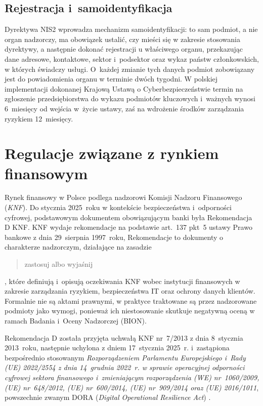 \subsection{Rejestracja i~samoidentyfikacja}

Dyrektywa NIS2 wprowadza mechanizm {samoidentyfikacji}: to sam podmiot, a nie organ nadzorczy, ma obowiązek ustalić, czy mieści się w zakresie
stosowania dyrektywy, a następnie dokonać rejestracji u właściwego organu, przekazując dane adresowe, kontaktowe, sektor i~podsektor oraz wykaz państw
członkowskich, w których świadczy usługi. O~każdej zmianie tych danych podmiot zobowiązany jest do powiadomienia organu w terminie dwóch tygodni.
W polskiej implementacji dokonanej Krajową Ustawą o Cyberbezpieczeństwie\autocite{uksc2026} termin na zgłoszenie przedsiębiorstwa do wykazu
podmiotów kluczowych i~ważnych wynosi 6~miesięcy od wejścia w~życie ustawy, zaś na wdrożenie środków zarządzania ryzykiem 12~miesięcy.

\section{Regulacje związane z rynkiem finansowym}

Rynek finansowy w Polsce podlega nadzorowi Komisji Nadzoru Finansowego (\textit{KNF}). Do stycznia 2025~roku w kontekście bezpieczeństwa i~odporności cyfrowej,
podstawowym dokumentem obowiązującym banki była {Rekomendacja D KNF}\autocite{knf_rekomendacja_d_2013}.
KNF wydaje rekomendacje na podstawie art.~137 pkt~5 ustawy Prawo bankowe z dnia 29~sierpnia 1997~roku, Rekomendacje to dokumenty o charakterze nadzorczym,
działające na zasadzie \blockquote{zastosuj albo wyjaśnij}, które definiują i~opisują oczekiwania KNF wobec instytucji finansowych w zakresie
zarządzania ryzykiem, bezpieczeństwa IT oraz ochrony danych klientów. Formalnie nie są aktami prawnymi, w praktyce traktowane są przez nadzorowane podmioty jako  wymogi, ponieważ ich niestosowanie skutkuje negatywną oceną w ramach Badania i~Oceny Nadzorczej (BION)\autocite{knf_bion_2024}.

Rekomendacja D została przyjęta uchwałą KNF nr~7/2013 z dnia 8~stycznia 2013~roku, następnie  uchylona z dniem 17~stycznia 2025~r. i~zastąpiona
bezpośrednio stosowanym \textit{Rozporządzeniem Parlamentu Europejskiego i~Rady (UE) 2022/2554 z dnia 14~grudnia 2022~r. w sprawie operacyjnej odporności cyfrowej sektora finansowego i~zmieniającym rozporządzenia (WE) nr~1060/2009, (UE) nr~648/2012, (UE) nr~600/2014, (UE) nr~909/2014
oraz (UE) 2016/1011}, powszechnie zwanym DORA (\textit{Digital Operational Resilience Act}) \autocite{dora2022}.

